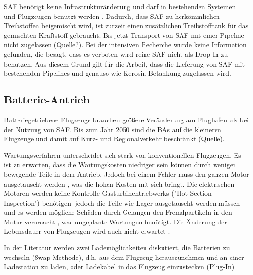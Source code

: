 SAF benötigt keine Infrastrukturänderung und darf in bestehenden Systemen und Flugzeugen benutzt werden \cite{dalmia2022powering}.
Dadurch, dass SAF zu herkömmlichen Treibstoffen beigemischt wird, ist zurzeit einen zusätzlichen Treibstofftank 
für das gemischten Kraftstoff gebraucht. Bis jetzt Transport von SAF mit einer Pipeline nicht zugelassen (Quelle?).
Bei der intensiven Recherche wurde keine Information gefunden, die besagt, dass es verboten wird reine SAF nicht als
Drop-In zu benutzen. Aus diesem Grund gilt für die Arbeit, dass die Lieferung von SAF mit bestehenden Pipelines 
und genauso wie Kerosin-Betankung zugelassen wird.

\subsection{Batterie-Antrieb}
Batteriegetriebene Flugzeuge brauchen größere Veränderung am Flughafen als bei der Nutzung von SAF.
Bis zum Jahr 2050 sind die BAs auf die kleineren Flugzeuge und damit auf Kurz- und Regionalverkehr beschränkt (Quelle). 

Wartungsverfahren unterscheidet sich stark von konventionellen Flugzeugen. 
Es ist zu erwarten, dass die Wartungskosten niedriger sein können durch weniger bewegende Teile in dem Antrieb. 
Jedoch bei einem Fehler muss den ganzen Motor ausgetauscht werden \cite{dalmia2022powering}, 
was die hohen Kosten mit sich bringt.
Die elektrischen Motoren werden keine Kontrolle Gasturbinentriebwerks ("Hot-Section Inspection") benötigen, 
jedoch die Teile wie Lager ausgetauscht werden müssen und 
es werden mögliche Schäden durch Gelangen den Fremdpartikeln in den Motor verursacht \cite{reimers2018introduction}, was ungeplante
Wartungen benötigt.
Die Änderung der Lebensdauer von Flugzeugen wird auch nicht erwartet \cite{reimers2018introduction}.

In der Literatur werden zwei Lademöglichkeiten diskutiert, die Batterien zu wechseln (Swap-Methode), d.h. aus dem Flugzeug herauszunehmen und 
an einer Ladestation zu laden, oder Ladekabel in das Flugzeug einzustecken (Plug-In).
%


